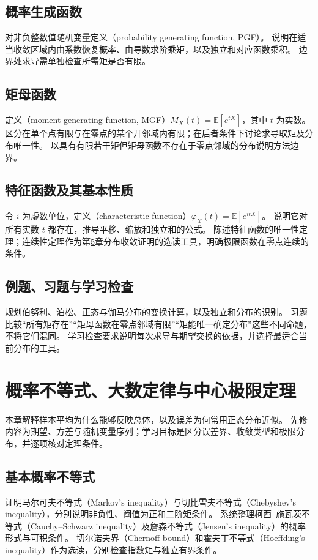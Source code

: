 \documentclass[UTF8,12pt,a4paper,fontset=fandol]{ctexbook}
\begin{document}
\section{概率生成函数}
\label{sec:ps-pgf}
对非负整数值随机变量定义（probability generating function, PGF）。
说明在适当收敛区域内由系数恢复概率、由导数求阶乘矩，以及独立和对应函数乘积。
边界处求导需单独检查所需矩是否有限。

\section{矩母函数}
\label{sec:ps-mgf}
定义（moment-generating function, MGF）$M_X(t)=\mathbb E[e^{tX}]$，其中 $t$ 为实数。
区分在单个点有限与在零点的某个开邻域内有限；在后者条件下讨论求导取矩及分布唯一性。
以具有有限若干矩但矩母函数不存在于零点邻域的分布说明方法边界。

\section{特征函数及其基本性质}
\label{sec:ps-characteristic-function}
令 $i$ 为虚数单位，定义（characteristic function）$\varphi_X(t)=\mathbb E[e^{itX}]$。
说明它对所有实数 $t$ 都存在，推导平移、缩放和独立和的公式。
陈述特征函数的唯一性定理；连续性定理作为第\ref{chap:ps-limits}章分布收敛证明的选读工具，明确极限函数在零点连续的条件。

\section{例题、习题与学习检查}
规划伯努利、泊松、正态与伽马分布的变换计算，以及独立和分布的识别。
习题比较“所有矩存在”“矩母函数在零点邻域有限”“矩能唯一确定分布”这些不同命题，不将它们混同。
学习检查要求说明每次求导与期望交换的依据，并选择最适合当前分布的工具。


\chapter{概率不等式、大数定律与中心极限定理}
\label{chap:ps-limits}

本章解释样本平均为什么能够反映总体，以及误差为何常用正态分布近似。
先修内容为期望、方差与随机变量序列；学习目标是区分误差界、收敛类型和极限分布，并逐项核对定理条件。

\section{基本概率不等式}
\label{sec:ps-probability-inequalities}
证明马尔可夫不等式（Markov's inequality）与切比雪夫不等式（Chebyshev's inequality），分别说明非负性、阈值为正和二阶矩条件。
系统整理柯西--施瓦茨不等式（Cauchy--Schwarz inequality）及詹森不等式（Jensen's inequality）的概率形式与可积条件。
切尔诺夫界（Chernoff bound）和霍夫丁不等式（Hoeffding's inequality）作为选读，分别检查指数矩与独立有界条件。
\end{document}
